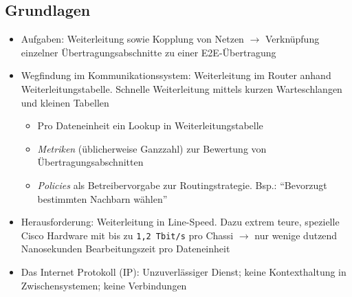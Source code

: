 \subsection{Grundlagen}
\begin{itemize}
	\item Aufgaben: Weiterleitung sowie Kopplung von Netzen \(\rightarrow\) Verknüpfung einzelner Übertragungsabschnitte zu einer E2E-Übertragung
	\item Wegfindung im Kommunikationssystem: Weiterleitung im Router anhand Weiterleitungstabelle. Schnelle Weiterleitung mittels kurzen Warteschlangen und kleinen Tabellen
	\begin{itemize}
		\item Pro Dateneinheit ein Lookup in Weiterleitungstabelle
		\item \textit{Metriken} (üblicherweise Ganzzahl) zur Bewertung von Übertragungsabschnitten
		\item \textit{Policies} als Betreibervorgabe zur Routingstrategie. Bsp.: "`Bevorzugt bestimmten Nachbarn wählen"'
	\end{itemize}
	\item Herausforderung: Weiterleitung in Line-Speed. Dazu extrem teure, spezielle Cisco Hardware mit bis zu \texttt{1,2 Tbit/s} pro Chassi \(\rightarrow\) nur wenige dutzend Nanosekunden Bearbeitungszeit pro Dateneinheit
	\item Das Internet Protokoll (IP): Unzuverlässiger Dienst; keine Kontexthaltung in Zwischensystemen; keine Verbindungen
\end{itemize}

